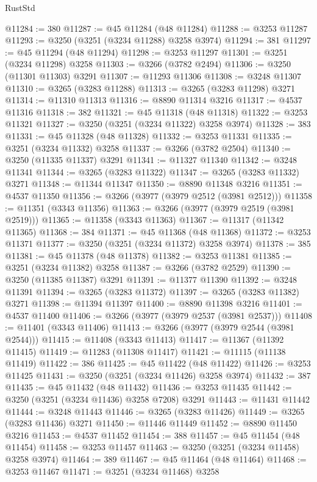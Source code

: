 \begin{lexlean}{RustStd}
\begin{coremodule}
@11284 := 380
@11287 := @45 @11284 (@48 @11284)
@11288 := @3253 @11287
@11293 := @3250 (@3251 (@3234 @11288) @3258 @3974)
@11294 := 381
@11297 := @45 @11294 (@48 @11294)
@11298 := @3253 @11297
@11301 := @3251 (@3234 @11298) @3258
@11303 := @3266 (@3782 @2494)
@11306 := @3250 (@11301 @11303) @3291
@11307 := @11293 @11306
@11308 := @3248 @11307
@11310 := @3265 (@3283 @11288)
@11313 := @3265 (@3283 @11298) @3271
@11314 := @11310 @11313
@11316 := @8890 @11314 @3216
@11317 := @4537 @11316
@11318 := 382
@11321 := @45 @11318 (@48 @11318)
@11322 := @3253 @11321
@11327 := @3250 (@3251 (@3234 @11322) @3258 @3974)
@11328 := 383
@11331 := @45 @11328 (@48 @11328)
@11332 := @3253 @11331
@11335 := @3251 (@3234 @11332) @3258
@11337 := @3266 (@3782 @2504)
@11340 := @3250 (@11335 @11337) @3291
@11341 := @11327 @11340
@11342 := @3248 @11341
@11344 := @3265 (@3283 @11322)
@11347 := @3265 (@3283 @11332) @3271
@11348 := @11344 @11347
@11350 := @8890 @11348 @3216
@11351 := @4537 @11350
@11356 := @3266 (@3977 (@3979 @2512 (@3981 @2512)))
@11358 := @11351 (@3343 @11356)
@11363 := @3266 (@3977 (@3979 @2519 (@3981 @2519)))
@11365 := @11358 (@3343 @11363)
@11367 := @11317 (@11342 @11365)
@11368 := 384
@11371 := @45 @11368 (@48 @11368)
@11372 := @3253 @11371
@11377 := @3250 (@3251 (@3234 @11372) @3258 @3974)
@11378 := 385
@11381 := @45 @11378 (@48 @11378)
@11382 := @3253 @11381
@11385 := @3251 (@3234 @11382) @3258
@11387 := @3266 (@3782 @2529)
@11390 := @3250 (@11385 @11387) @3291
@11391 := @11377 @11390
@11392 := @3248 @11391
@11394 := @3265 (@3283 @11372)
@11397 := @3265 (@3283 @11382) @3271
@11398 := @11394 @11397
@11400 := @8890 @11398 @3216
@11401 := @4537 @11400
@11406 := @3266 (@3977 (@3979 @2537 (@3981 @2537)))
@11408 := @11401 (@3343 @11406)
@11413 := @3266 (@3977 (@3979 @2544 (@3981 @2544)))
@11415 := @11408 (@3343 @11413)
@11417 := @11367 (@11392 @11415)
@11419 := @11283 (@11308 @11417)
@11421 := @11115 (@11138 @11419)
@11422 := 386
@11425 := @45 @11422 (@48 @11422)
@11426 := @3253 @11425
@11431 := @3250 (@3251 (@3234 @11426) @3258 @3974)
@11432 := 387
@11435 := @45 @11432 (@48 @11432)
@11436 := @3253 @11435
@11442 := @3250 (@3251 (@3234 @11436) @3258 @7208) @3291
@11443 := @11431 @11442
@11444 := @3248 @11443
@11446 := @3265 (@3283 @11426)
@11449 := @3265 (@3283 @11436) @3271
@11450 := @11446 @11449
@11452 := @8890 @11450 @3216
@11453 := @4537 @11452
@11454 := 388
@11457 := @45 @11454 (@48 @11454)
@11458 := @3253 @11457
@11463 := @3250 (@3251 (@3234 @11458) @3258 @3974)
@11464 := 389
@11467 := @45 @11464 (@48 @11464)
@11468 := @3253 @11467
@11471 := @3251 (@3234 @11468) @3258

\end{coremodule}
\end{lexlean}
